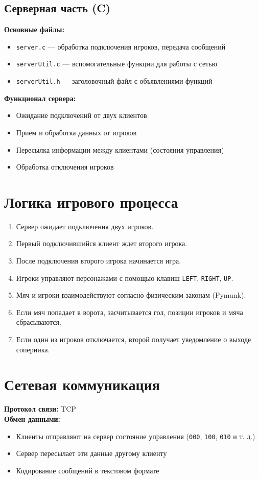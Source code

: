 \documentclass{article}
\begin{document}
\subsection{Серверная часть (C)}
\textbf{Основные файлы:}
\begin{itemize}
    \item \texttt{server.c} — обработка подключения игроков, передача сообщений
    \item \texttt{serverUtil.c} — вспомогательные функции для работы с сетью
    \item \texttt{serverUtil.h} — заголовочный файл с объявлениями функций
\end{itemize}

\textbf{Функционал сервера:}
\begin{itemize}
    \item Ожидание подключений от двух клиентов
    \item Прием и обработка данных от игроков
    \item Пересылка информации между клиентами (состояния управления)
    \item Обработка отключения игроков
\end{itemize}

\section{Логика игрового процесса}
\begin{enumerate}
    \item Сервер ожидает подключения двух игроков.
    \item Первый подключившийся клиент ждет второго игрока.
    \item После подключения второго игрока начинается игра.
    \item Игроки управляют персонажами с помощью клавиш \texttt{LEFT}, \texttt{RIGHT}, \texttt{UP}.
    \item Мяч и игроки взаимодействуют согласно физическим законам (Pymunk).
    \item Если мяч попадает в ворота, засчитывается гол, позиции игроков и мяча сбрасываются.
    \item Если один из игроков отключается, второй получает уведомление о выходе соперника.
\end{enumerate}

\section{Сетевая коммуникация}
\textbf{Протокол связи:} TCP  \\
\textbf{Обмен данными:}
\begin{itemize}
    \item Клиенты отправляют на сервер состояние управления (\texttt{000}, \texttt{100}, \texttt{010} и т. д.)
    \item Сервер пересылает эти данные другому клиенту
    \item Кодирование сообщений в текстовом формате
\end{itemize}
\end{document}
